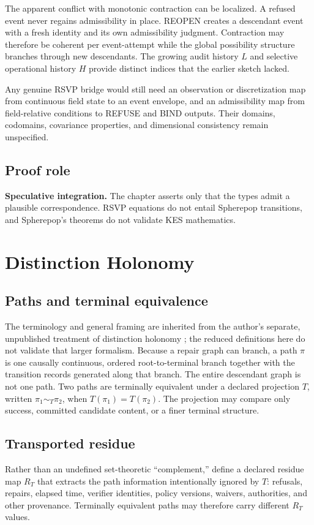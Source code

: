 \documentclass[11pt,openany]{book}
\begin{document}
The apparent conflict with monotonic contraction can be localized. A refused
event never regains admissibility in place. REOPEN creates a descendant event
with a fresh identity and its own admissibility judgment. Contraction may
therefore be coherent per event-attempt while the global possibility structure
branches through new descendants. The growing audit history \(L\) and selective
operational history \(H\) provide distinct indices that the earlier sketch
lacked.

Any genuine RSVP bridge would still need an observation or discretization map
from continuous field state to an event envelope, and an admissibility map from
field-relative conditions to REFUSE and BIND outputs. Their domains,
codomains, covariance properties, and dimensional consistency remain
unspecified.

\section{Proof role}
\textbf{Speculative integration.} The chapter asserts only that the types admit
a plausible correspondence. RSVP equations do not entail Spherepop
transitions, and Spherepop's theorems do not validate KES mathematics.

\chapter{Distinction Holonomy}
\section{Paths and terminal equivalence}
The terminology and general framing are inherited from the author's separate,
unpublished treatment of distinction holonomy \cite{flyxion-holonomy}; the
reduced definitions here do not validate that larger formalism.
Because a repair graph can branch, a path \(\pi\) is one causally continuous,
ordered root-to-terminal branch together with the transition records generated
along that branch. The entire descendant graph is not one path. Two paths are
terminally equivalent under a declared projection \(T\), written
\(\pi_1\sim_T\pi_2\), when \(T(\pi_1)=T(\pi_2)\). The projection may compare
only success, committed candidate content, or a finer terminal structure.

\section{Transported residue}
Rather than an undefined set-theoretic “complement,” define a declared residue
map \(R_T\) that extracts the path information intentionally ignored by
\(T\): refusals, repairs, elapsed time, verifier identities, policy versions,
waivers, authorities, and other provenance. Terminally equivalent paths may
therefore carry different \(R_T\) values.
\end{document}
